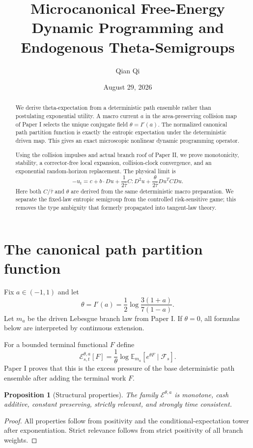 \documentclass[11pt,reqno]{amsart}
\title[Microcanonical free energy and theta semigroups]{Microcanonical Free-Energy Dynamic Programming and Endogenous Theta-Semigroups}
\author{Qian Qi}
\date{August 29, 2026}
\newtheorem{proposition}[theorem]{Proposition}
\theoremstyle{remark}
\newcommand{\E}{\mathbb E}
\newcommand{\cE}{\mathcal E}
\begin{document}
\raggedbottom
\begin{abstract}
We derive theta-expectation from a deterministic path ensemble rather than
postulating exponential utility.  A macro current $a$ in the area-preserving
collision map of Paper I selects the unique conjugate field
$\theta=I'(a)$.  The normalized canonical path partition function is exactly
the entropic expectation under the deterministic driven map.  This gives an
exact microscopic nonlinear dynamic programming operator.

Using the collision impulses and actual branch roof of Paper II, we prove
monotonicity, stability, a corrector-free local expansion, collision-clock
convergence, and an exponential random-horizon replacement.  The physical
limit is
\[
 -u_t=c+b\cdot Du+\frac1{2\bar\tau}C:D^2u
 +\frac{\theta}{2\bar\tau}Du^TC Du.
\]
Here both $C/\bar\tau$ and $\theta$ are derived from the same deterministic
macro preparation.  We separate the fixed-law entropic semigroup from the
controlled risk-sensitive game; this removes the type ambiguity that formerly
propagated into tangent-law theory.
\end{abstract}
\maketitle
\tableofcontents

\section{The canonical path partition function}
Fix $a\in(-1,1)$ and let
\[
 \theta=I'(a)=\frac12\log\frac{3(1+a)}{7(1-a)}.
\]
Let $m_a$ be the driven Lebesgue branch law from Paper I.  If $\theta=0$, all
formulas below are interpreted by continuous extension.

For a bounded terminal functional $F$ define
\[
 \cE_{s,t}^{\theta,a}[F]
 =\frac1\theta\log
 \E_{m_a}\left[e^{\theta F}\mid\mathcal F_s\right].
\]
Paper I proves that this is the excess pressure of the base deterministic path
ensemble after adding the terminal work $F$.

\begin{proposition}[Structural properties]\label{prop:structure}
The family $\cE^{\theta,a}$ is monotone, cash additive, constant preserving,
strictly relevant, and strongly time consistent.
\end{proposition}
\begin{proof}
All properties follow from positivity and the conditional-expectation tower
after exponentiation.  Strict relevance follows from strict positivity of all
branch weights.
\end{proof}
\end{document}
